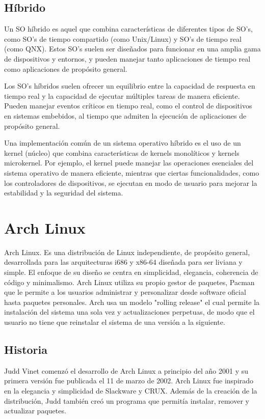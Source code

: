 \documentclass[12pt, a4paper]{article} %
\begin{document}
\subsection{Híbrido}

Un SO híbrido es aquel que combina características de diferentes tipos de SO's, como SO's de tiempo compartido (como Unix/Linux) y SO's de tiempo real (como QNX). Estos SO's suelen ser diseñados para funcionar en una amplia gama de dispositivos y entornos, y pueden manejar tanto aplicaciones de tiempo real como aplicaciones de propósito general.

Los SO's híbridos suelen ofrecer un equilibrio entre la capacidad de respuesta en tiempo real y la capacidad de ejecutar múltiples tareas de manera eficiente. Pueden manejar eventos críticos en tiempo real, como el control de dispositivos en sistemas embebidos, al tiempo que admiten la ejecución de aplicaciones de propósito general.

Una implementación común de un sistema operativo híbrido es el uso de un kernel (núcleo) que combina características de kernels monolíticos y kernels microkernel. Por ejemplo, el kernel puede manejar las operaciones esenciales del sistema operativo de manera eficiente, mientras que ciertas funcionalidades, como los controladores de dispositivos, se ejecutan en modo de usuario para mejorar la estabilidad y la seguridad del sistema.

\clearpage
\section{Arch Linux}

Arch Linux. Es una distribución de Linux independiente, de propósito general, desarrollada para las arquitecturas i686 y x86-64 diseñada para ser liviana y simple. El enfoque de su diseño se centra en simplicidad, elegancia, coherencia de código y minimalismo. Arch Linux utiliza su propio gestor de paquetes, Pacman que le permite a los usuarios administrar y personalizar desde software oficial hasta paquetes personales. Arch usa un modelo "rolling release" el cual permite la instalación del sistema una sola vez y actualizaciones perpetuas, de modo que el usuario no tiene que reinstalar el sistema de una versión a la siguiente.

\subsection{Historia}

Judd Vinet comenzó el desarrollo de Arch Linux a principio del año 2001 y su primera versión fue publicada el 11 de marzo de 2002. Arch Linux fue inspirado en la elegancia y simplicidad de Slackware y CRUX. Además de la creación de la distribución, Judd también creó un programa que permitía instalar, remover y actualizar paquetes.
\end{document}
